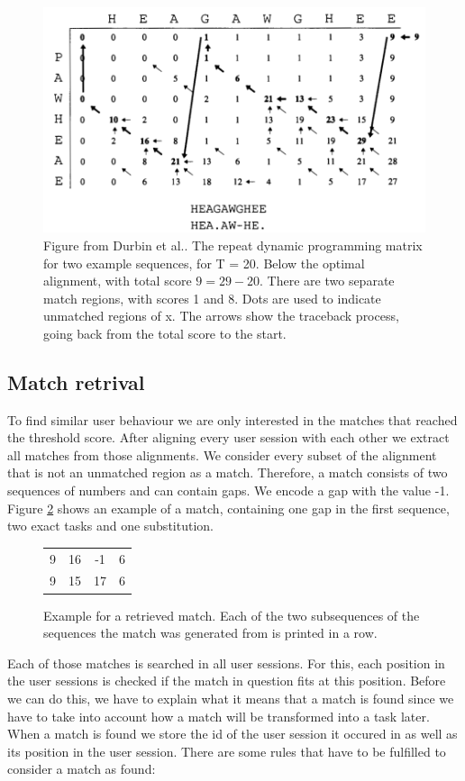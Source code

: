 \begin{figure}
\centering
\includegraphics[scale=0.4]{chapters/approach/smithwatermanrepeated.png}
\caption{Figure from Durbin et al.\cite{durbin1998}. The repeat dynamic programming matrix for two example sequences, for T = 20. Below the optimal alignment, with total score \mbox{$9 = 29-20$}. There are two separate match regions, with scores 1 and 8. Dots are used to indicate unmatched regions of x. The arrows show the traceback process, going back from the total score to the start.}
\label{fig:durbindpmatrixtraceback}
\end{figure}

\subsection{Match retrival}
To find similar user behaviour we are only interested in the matches that reached the threshold score.
After aligning every user session with each other we extract all matches from those alignments.
We consider every subset of the alignment that is not an unmatched region as a match.
Therefore, a match consists of two sequences of numbers and can contain gaps.
We encode a gap with the value -1.
Figure \ref{fig:matchexample} shows an example of a match, containing one gap in the first sequence, two exact tasks and one substitution.

\begin{figure}[h]
	\centering
	\begin{tabular}{cccc}
		9 & 16 & -1 & 6 \\
		9 & 15 & 17 & 6
	\end{tabular}
	\caption{Example for a retrieved match. Each of the two subsequences of the sequences the match was generated from is printed in a row.}
	\label{fig:matchexample}
\end{figure}
Each of those matches is searched in all user sessions.
For this, each position in the user sessions is checked if the match in question fits at this position.
Before we can do this, we have to explain what it means that a match is found since we have to take into account how a match will be transformed into a task later.
When a match is found we store the id of the user session it occured in as well as its position in the user session.
There are some rules that have to be fulfilled to consider a match as found:

